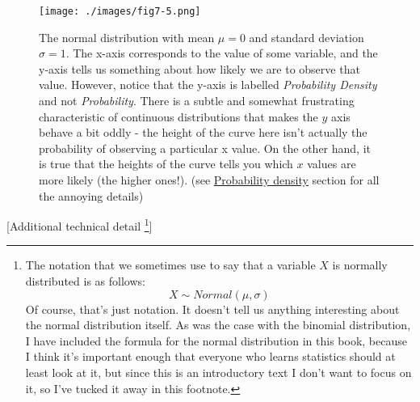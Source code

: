 \documentclass[
  letterpaper,
]{book}
\begin{document}
\begin{figure}

\texttt{[image: ./images/fig7-5.png]} \hfill{}

\caption{\label{fig-fig7-5}The normal distribution with mean \(\mu = 0\)
and standard deviation \(\sigma = 1\). The x-axis corresponds to the
value of some variable, and the y-axis tells us something about how
likely we are to observe that value. However, notice that the y-axis is
labelled \emph{Probability Density} and not \emph{Probability}. There is
a subtle and somewhat frustrating characteristic of continuous
distributions that makes the \(y\) axis behave a bit oddly - the height
of the curve here isn't actually the probability of observing a
particular x value. On the other hand, it is true that the heights of
the curve tells you which \(x\) values are more likely (the higher
ones!). (see \protect\hyperlink{probability-density}{Probability
density} section for all the annoying details)}

\end{figure}

{[}Additional technical detail \footnote{The notation that we sometimes
  use to say that a variable \(X\) is normally distributed is as
  follows: \[X \sim Normal(\mu,\sigma)\] Of course, that's just
  notation. It doesn't tell us anything interesting about the normal
  distribution itself. As was the case with the binomial distribution, I
  have included the formula for the normal distribution in this book,
  because I think it's important enough that everyone who learns
  statistics should at least look at it, but since this is an
  introductory text I don't want to focus on it, so I've tucked it away
  in this footnote.}{]}
\end{document}
